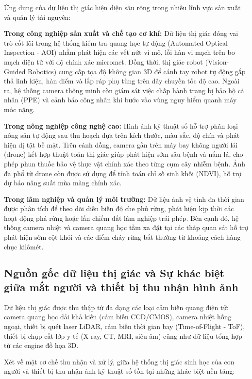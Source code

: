 Ứng dụng của dữ liệu thị giác hiện diện sâu rộng trong nhiều lĩnh vực sản xuất và quản lý tài nguyên:

\textbf{Trong công nghiệp sản xuất và chế tạo cơ khí:} Dữ liệu thị giác đóng vai trò cốt lõi trong hệ thống kiểm tra quang học tự động (Automated Optical Inspection - AOI) nhằm phát hiện các vết nứt vi mô, lỗi hàn vi mạch trên bo mạch điện tử với độ chính xác micromet. Đồng thời, thị giác robot (Vision-Guided Robotics) cung cấp tọa độ không gian 3D để cánh tay robot tự động gắp thả linh kiện, hàn điểm và lắp ráp phụ tùng trên dây chuyền tốc độ cao. Ngoài ra, hệ thống camera thông minh còn giám sát việc chấp hành trang bị bảo hộ cá nhân (PPE) và cảnh báo công nhân khi bước vào vùng nguy hiểm quanh máy móc nặng.

\textbf{Trong nông nghiệp công nghệ cao:} Hình ảnh kỹ thuật số hỗ trợ phân loại nông sản tự động sau thu hoạch dựa trên kích thước, màu sắc, độ chín và phát hiện dị tật bề mặt. Trên cánh đồng, camera gắn trên máy bay không người lái (drone) kết hợp thuật toán thị giác giúp phát hiện sớm sâu bệnh và nấm lá, cho phép phun thuốc bảo vệ thực vật chính xác theo từng cụm cây nhiễm bệnh. Ảnh đa phổ từ drone còn được sử dụng để tính toán chỉ số sinh khối (NDVI), hỗ trợ dự báo năng suất mùa màng chính xác.

\textbf{Trong lâm nghiệp và quản lý môi trường:} Dữ liệu ảnh vệ tinh đa thời gian được phân tích để theo dõi diễn biến độ che phủ rừng, phát hiện kịp thời các hoạt động phá rừng hoặc lấn chiếm đất lâm nghiệp trái phép. Bên cạnh đó, hệ thống camera nhiệt và camera quang học tầm xa đặt tại các tháp quan sát hỗ trợ phát hiện sớm cột khói và các điểm cháy rừng bất thường từ khoảng cách hàng chục kilômét.

\subsection{Nguồn gốc dữ liệu thị giác và Sự khác biệt giữa mắt người và thiết bị thu nhận hình ảnh}

Dữ liệu thị giác được thu thập từ đa dạng các loại cảm biến quang điện tử: camera quang học dải khả kiến (cảm biến CCD/CMOS), camera nhiệt hồng ngoại, thiết bị quét laser LiDAR, cảm biến thời gian bay (Time-of-Flight - ToF), thiết bị chụp cắt lớp y tế (X-ray, CT, MRI, siêu âm) cũng như dữ liệu tổng hợp từ các engine đồ họa 3D.

Xét về mặt cơ chế thu nhận và xử lý, giữa hệ thống thị giác sinh học của con người và thiết bị thu nhận ảnh kỹ thuật số tồn tại những khác biệt nền tảng:

